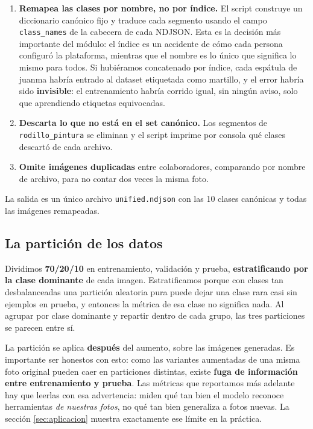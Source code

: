 \documentclass[11pt,a4paper]{article}
\newcommand{\clase}[1]{\texttt{#1}}
\begin{document}
\begin{enumerate}
  \item \textbf{Remapea las clases por nombre, no por índice.} El script construye un diccionario
        canónico fijo y traduce cada segmento usando el campo \texttt{class\_names} de la cabecera
        de cada NDJSON. Esta es la decisión más importante del módulo: el índice es un accidente
        de cómo cada persona configuró la plataforma, mientras que el nombre es lo único que
        significa lo mismo para todos. Si hubiéramos concatenado por índice, cada espátula de
        juanma habría entrado al dataset etiquetada como martillo, y el error habría sido
        \textbf{invisible}: el entrenamiento habría corrido igual, sin ningún aviso, solo que
        aprendiendo etiquetas equivocadas.
  \item \textbf{Descarta lo que no está en el set canónico.} Los segmentos de
        \clase{rodillo\_pintura} se eliminan y el script imprime por consola qué clases descartó
        de cada archivo.
  \item \textbf{Omite imágenes duplicadas} entre colaboradores, comparando por nombre de archivo,
        para no contar dos veces la misma foto.
\end{enumerate}

La salida es un único archivo \texttt{unified.ndjson} con las 10 clases canónicas y todas las
imágenes remapeadas.

\subsection{La partición de los datos}

Dividimos \textbf{70/20/10} en entrenamiento, validación y prueba, \textbf{estratificando por la
clase dominante} de cada imagen. Estratificamos porque con clases tan desbalanceadas una partición
aleatoria pura puede dejar una clase rara casi sin ejemplos en prueba, y entonces la métrica de esa
clase no significa nada. Al agrupar por clase dominante y repartir dentro de cada grupo, las tres
particiones se parecen entre sí.

La partición se aplica \textbf{después} del aumento, sobre las imágenes generadas. Es importante
ser honestos con esto: como las variantes aumentadas de una misma foto original pueden caer en
particiones distintas, existe \textbf{fuga de información entre entrenamiento y prueba}. Las
métricas que reportamos más adelante hay que leerlas con esa advertencia: miden qué tan bien el
modelo reconoce herramientas \emph{de nuestras fotos}, no qué tan bien generaliza a fotos nuevas.
La sección \ref{sec:aplicacion} muestra exactamente ese límite en la práctica.
\end{document}
